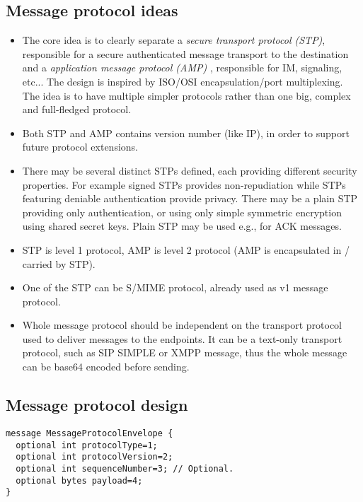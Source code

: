 \documentclass[a4paper,10pt]{article}
\begin{document}
\subsection{Message protocol ideas}
\begin{itemize}
 \item The core idea is to clearly separate a {\it secure transport protocol (STP)}, responsible for a secure authenticated message transport to the destination
and a {\it application message protocol (AMP) }, responsible for IM, signaling, etc... The design is inspired by ISO/OSI encapsulation/port multiplexing.
The idea is to have multiple simpler protocols rather than one big, complex and full-fledged protocol.

 \item Both STP and AMP contains version number (like IP), in order to support future protocol extensions.

 \item There may be several distinct STPs defined, each providing different security properties. 
 For example signed STPs provides non-repudiation while STPs featuring deniable authentication
provide privacy. There may be a plain STP providing only authentication, or using only simple symmetric encryption 
using shared secret keys. Plain STP may be used e.g., for ACK messages.

 \item STP is level 1 protocol, AMP is level 2 protocol (AMP is encapsulated in / carried by STP).
 
 \item One of the STP can be S/MIME protocol, already used as v1 message protocol.  
 
 \item Whole message protocol should be independent on the transport protocol used to deliver messages to the endpoints. It can be
 a text-only transport protocol, such as SIP SIMPLE or XMPP message, thus the whole message can be base64 encoded before sending.
\end{itemize}

\subsection{Message protocol design}
\begin{Verbatim}[frame=single]
message MessageProtocolEnvelope {
  optional int protocolType=1;
  optional int protocolVersion=2;
  optional int sequenceNumber=3; // Optional.
  optional bytes payload=4;
}
\end{Verbatim} 
\end{document}
